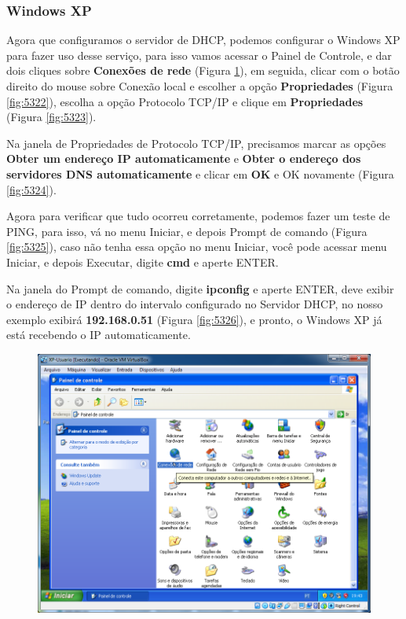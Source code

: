\documentclass[10pt]{article}
\begin{document}
\subsubsection{Windows XP}
\par Agora que configuramos o servidor de DHCP, podemos configurar o Windows XP para fazer uso desse serviço, para isso vamos acessar o Painel de Controle, e dar dois cliques sobre \textbf{Conexões de rede}  (Figura \ref{fig:5321}), em seguida, clicar com o botão direito do mouse sobre Conexão local e escolher a opção \textbf{Propriedades}  (Figura \ref{fig:5322}), escolha a opção Protocolo TCP/IP e clique em \textbf{Propriedades} (Figura \ref{fig:5323}).
\par Na janela de Propriedades de Protocolo TCP/IP, precisamos marcar as opções \textbf{Obter um endereço IP automaticamente} e \textbf{Obter o endereço dos servidores DNS automaticamente} e clicar em \textbf{OK} e OK novamente (Figura \ref{fig:5324}).
\par Agora para verificar que tudo ocorreu corretamente, podemos fazer um teste de PING, para isso, vá no menu Iniciar, e depois Prompt de comando (Figura \ref{fig:5325}), caso não tenha essa opção no menu Iniciar, você pode acessar menu Iniciar, e depois Executar, digite \textbf{cmd} e aperte ENTER.
\par Na janela do Prompt de comando, digite \textbf{ipconfig} e aperte ENTER, deve exibir o endereço de IP dentro do intervalo configurado no Servidor DHCP, no nosso exemplo exibirá \textbf{192.168.0.51} (Figura \ref{fig:5326}), e pronto, o Windows XP já está recebendo o IP automaticamente.
\begin{figure}[H]
    \centering
    \caption{}
    \label{fig:5321}
    \includegraphics[width=\linewidth]{images/windows_server/dhcp/019.png}
\end{figure}
\end{document}
